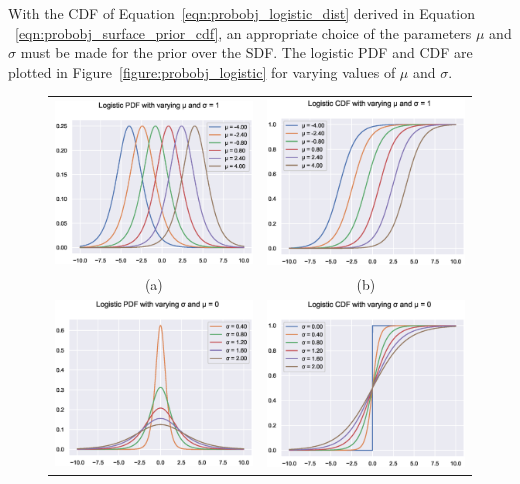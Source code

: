 With the CDF of Equation~\ref{eqn:probobj_logistic_dist} derived in Equation
~\ref{eqn:probobj_surface_prior_cdf}, an appropriate choice of the parameters \( \mu \)
and \( \sigma \) must be made for the prior over the SDF\@. The logistic PDF and CDF are 
plotted in Figure~\ref{figure:probobj_logistic} for varying values of \( \mu \) and \( \sigma \).
\begin{figure}[!htbp]
	\centering
	\begin{tabular}{cc}
		\includegraphics[width=.45\linewidth]{figures/object_recon/logistic/mu_pdf.eps}&
    \includegraphics[width=.45\linewidth]{figures/object_recon/logistic/mu_cdf.eps} \\
    (a) & (b) \\
		\includegraphics[width=.45\linewidth]{figures/object_recon/logistic/sigma_pdf.eps}&
    \includegraphics[width=.45\linewidth]{figures/object_recon/logistic/sigma_cdf.eps} \\

\end{tabular}
\end{figure}

